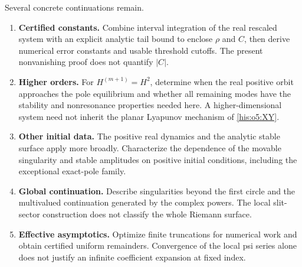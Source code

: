 \documentclass[11pt]{article}
\theoremstyle{remark}\newtheorem{remark}[theorem]{Remark}
\numberwithin{equation}{section}
\begin{document}
Several concrete continuations remain.
\begin{enumerate}
\item \textbf{Certified constants.} Combine interval integration of the
real rescaled system with an explicit analytic tail bound to enclose
$\rho$ and $C$, then derive numerical error constants and usable threshold
cutoffs. The present nonvanishing proof does not quantify $|C|$.
\item \textbf{Higher orders.} For $H^{(m+1)}=H^2$, determine when the real
positive orbit approaches the pole equilibrium and whether all remaining
modes have the stability and nonresonance properties needed here.
A higher-dimensional system need not inherit the planar Lyapunov
mechanism of \eqref{his:o5:XY}.
\item \textbf{Other initial data.} The positive real dynamics and the
analytic stable surface apply more broadly. Characterize the dependence
of the movable singularity and stable amplitudes on positive initial
conditions, including the exceptional exact-pole family.
\item \textbf{Global continuation.} Describe singularities beyond the
first circle and the multivalued continuation generated by the complex
powers. The local slit-sector construction does not classify the whole
Riemann surface.
\item \textbf{Effective asymptotics.} Optimize finite truncations for
numerical work and obtain certified uniform remainders. Convergence of
the local psi series alone does not justify an infinite coefficient
expansion at fixed index.
\end{enumerate}
\end{document}
